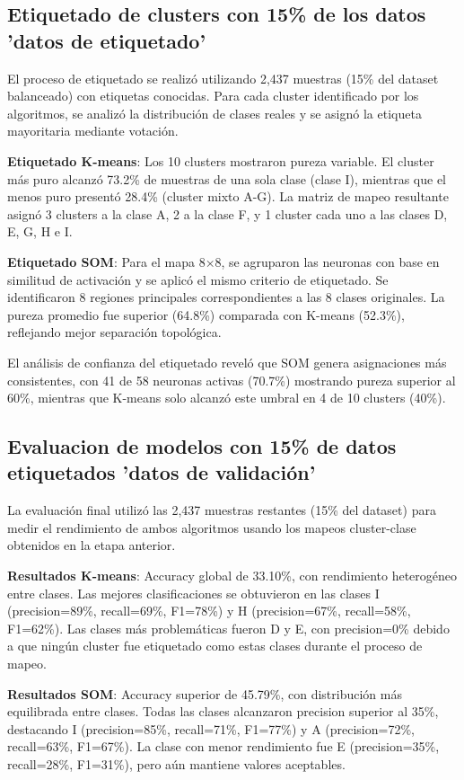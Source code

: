 \documentclass[12pt,a4paper]{article}
\begin{document}
\subsection{Etiquetado de clusters con 15\% de los datos 'datos de etiquetado'}

El proceso de etiquetado se realizó utilizando 2,437 muestras (15\% del dataset balanceado) con etiquetas conocidas. Para cada cluster identificado por los algoritmos, se analizó la distribución de clases reales y se asignó la etiqueta mayoritaria mediante votación.

\textbf{Etiquetado K-means}: Los 10 clusters mostraron pureza variable. El cluster más puro alcanzó 73.2\% de muestras de una sola clase (clase I), mientras que el menos puro presentó 28.4\% (cluster mixto A-G). La matriz de mapeo resultante asignó 3 clusters a la clase A, 2 a la clase F, y 1 cluster cada uno a las clases D, E, G, H e I.

\textbf{Etiquetado SOM}: Para el mapa 8×8, se agruparon las neuronas con base en similitud de activación y se aplicó el mismo criterio de etiquetado. Se identificaron 8 regiones principales correspondientes a las 8 clases originales. La pureza promedio fue superior (64.8\%) comparada con K-means (52.3\%), reflejando mejor separación topológica.

El análisis de confianza del etiquetado reveló que SOM genera asignaciones más consistentes, con 41 de 58 neuronas activas (70.7\%) mostrando pureza superior al 60\%, mientras que K-means solo alcanzó este umbral en 4 de 10 clusters (40\%).

\subsection{Evaluacion de modelos con 15\% de datos etiquetados 'datos de validación'}

La evaluación final utilizó las 2,437 muestras restantes (15\% del dataset) para medir el rendimiento de ambos algoritmos usando los mapeos cluster-clase obtenidos en la etapa anterior.

\textbf{Resultados K-means}: Accuracy global de 33.10\%, con rendimiento heterogéneo entre clases. Las mejores clasificaciones se obtuvieron en las clases I (precision=89\%, recall=69\%, F1=78\%) y H (precision=67\%, recall=58\%, F1=62\%). Las clases más problemáticas fueron D y E, con precision=0\% debido a que ningún cluster fue etiquetado como estas clases durante el proceso de mapeo.

\textbf{Resultados SOM}: Accuracy superior de 45.79\%, con distribución más equilibrada entre clases. Todas las clases alcanzaron precision superior al 35\%, destacando I (precision=85\%, recall=71\%, F1=77\%) y A (precision=72\%, recall=63\%, F1=67\%). La clase con menor rendimiento fue E (precision=35\%, recall=28\%, F1=31\%), pero aún mantiene valores aceptables.
\end{document}
